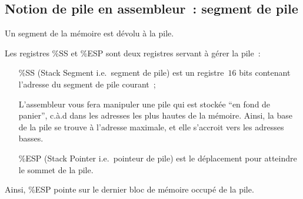 \begin{frame}
  \section{Notion de pile en assembleur~: segment de pile}%
  Un segment de la m\'emoire est d\'evolu \`a la pile.

Les registres \%SS et \%ESP sont deux registres servant \`a g\'erer la pile~:
\begin{itemize}
\item[\%SS] (Stack Segment i.e.\ segment de pile) est un registre~$16$
  bits contenant l'adresse du segment de pile courant~;
\item[]
\item[] L'assembleur vous fera manipuler une pile qui est stock\'ee ``en fond
de panier'', c.\`a.d dans les adresses les plus hautes de la
m\'emoire. Ainsi, la base de la pile se trouve \`a l'adresse maximale,
et elle s'accroit vers les adresses basses. 
\item[]
\item[\%ESP] (Stack Pointer i.e.\ pointeur de pile) est le d\'eplacement
  pour atteindre le sommet de la pile.
\end{itemize}
\par\medskip 
Ainsi, \%ESP pointe sur le dernier bloc de m\'emoire occup\'e de la pile.
\par\medskip 
\end{frame}

